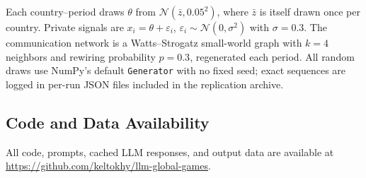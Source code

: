 \documentclass[10pt]{article}
\begin{document}
Each country--period draws $\theta$ from $\mathcal{N}(\bar{z}, 0.05^2)$, where $\bar{z}$ is itself drawn once per country. Private signals are $x_i = \theta + \varepsilon_i$, $\varepsilon_i \sim \mathcal{N}(0, \sigma^2)$ with $\sigma = 0.3$. The communication network is a Watts--Strogatz small-world graph with $k = 4$ neighbors and rewiring probability $p = 0.3$, regenerated each period. All random draws use NumPy's default \texttt{Generator} with no fixed seed; exact sequences are logged in per-run JSON files included in the replication archive.

\subsection{Code and Data Availability}

All code, prompts, cached LLM responses, and output data are available at \url{https://github.com/keltokhy/llm-global-games}.
\end{document}
